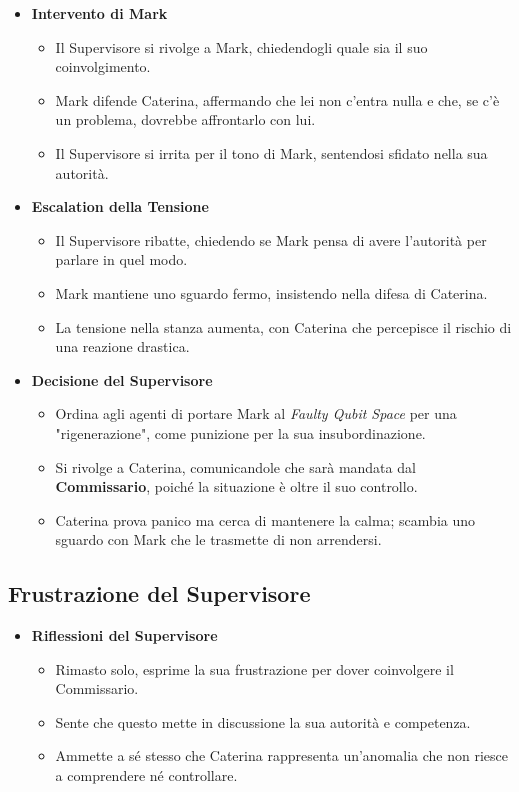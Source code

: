 \begin{itemize}
    \item \textbf{Intervento di Mark}
    \begin{itemize}
        \item Il Supervisore si rivolge a Mark, chiedendogli quale sia il suo coinvolgimento.
        \item Mark difende Caterina, affermando che lei non c'entra nulla e che, se c'è un problema, dovrebbe affrontarlo con lui.
        \item Il Supervisore si irrita per il tono di Mark, sentendosi sfidato nella sua autorità.
    \end{itemize}
    \item \textbf{Escalation della Tensione}
    \begin{itemize}
        \item Il Supervisore ribatte, chiedendo se Mark pensa di avere l'autorità per parlare in quel modo.
        \item Mark mantiene uno sguardo fermo, insistendo nella difesa di Caterina.
        \item La tensione nella stanza aumenta, con Caterina che percepisce il rischio di una reazione drastica.
    \end{itemize}
    \item \textbf{Decisione del Supervisore}
    \begin{itemize}
        \item Ordina agli agenti di portare Mark al \emph{Faulty Qubit Space} per una "rigenerazione", come punizione per la sua insubordinazione.
        \item Si rivolge a Caterina, comunicandole che sarà mandata dal \textbf{Commissario}, poiché la situazione è oltre il suo controllo.
        \item Caterina prova panico ma cerca di mantenere la calma; scambia uno sguardo con Mark che le trasmette di non arrendersi.
    \end{itemize}
\end{itemize}

\subsection*{Frustrazione del Supervisore}

\begin{itemize}
    \item \textbf{Riflessioni del Supervisore}
    \begin{itemize}
        \item Rimasto solo, esprime la sua frustrazione per dover coinvolgere il Commissario.
        \item Sente che questo mette in discussione la sua autorità e competenza.
        \item Ammette a sé stesso che Caterina rappresenta un'anomalia che non riesce a comprendere né controllare.
    \end{itemize}
\end{itemize}

